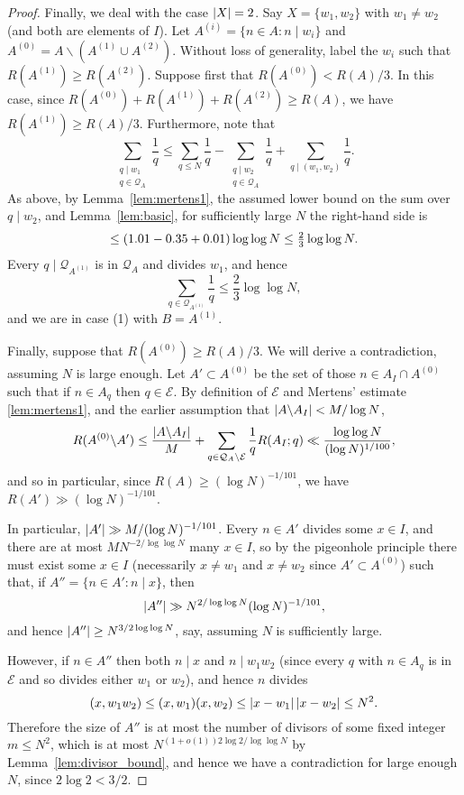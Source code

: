\begin{proof}
Finally, we deal with the case $\left\lvert X\right\rvert=2$. Say $X=\{w_1,w_2\}$ with $w_1\neq w_2$ (and both are elements of $I$). Let $A^{(i)}=\{n\in A: n\mid w_i\}$ and $A^{(0)}=A\backslash (A^{(1)}\cup A^{(2)})$. Without loss of generality, label the $w_i$ such that $R(A^{(1)})\geq R(A^{(2)})$.  Suppose first that $R(A^{(0)})<R(A)/3$. In this case, since $R(A^{(0)})+R(A^{(1)})+R(A^{(2)})\geq R(A)$, we have $R(A^{(1)})\geq R(A)/3$. Furthermore, note that
\[\sum_{\substack{q\mid w_1\\ q\in \mathcal{Q}_A}}\frac{1}{q}\leq \sum_{q\leq N}\frac{1}{q}-\sum_{\substack{q\mid w_2\\ q\in \mathcal{Q}_A}}\frac{1}{q}+\sum_{q\mid (w_1,w_2)}\frac{1}{q}.\]
As above, by Lemma~\ref{lem:mertens1}, the assumed lower bound on the sum over $q\mid w_2$, and Lemma~\ref{lem:basic}, for sufficiently large $N$ the right-hand side is
\[\leq \left( 1.01-0.35+0.01\right)\log\log N\leq \tfrac{2}{3}\log\log N.\]
Every $q\mid \mathcal{Q}_{A^{(1)}}$ is in $\mathcal{Q}_A$ and divides $w_1$, and hence
\[\sum_{q\in \mathcal{Q}_{A^{(1)}}}\frac{1}{q}\leq\frac{2}{3}\log\log N,\]
and we are in case (1) with $B=A^{(1)}$.

Finally, suppose that $R(A^{(0)})\geq R(A)/3$. We will derive a contradiction, assuming $N$ is large enough.  Let $A'\subset A^{(0)}$ be the set of those $n\in A_I\cap A^{(0)}$ such that if $n\in A_q$ then $q\in\mathcal{E}$. By definition of $\mathcal{E}$ and Mertens' estimate \ref{lem:mertens1}, and the earlier assumption that $\left\lvert A\backslash A_I\right\rvert<M/\log N$,
  \[R(A^{(0)}\backslash A')\leq \frac{\left\lvert A\backslash A_I\right\rvert}{M}+\sum_{q\in\mathcal{Q}_A\backslash \mathcal{E}}\frac{1}{q}R(A_I;q)\ll \frac{\log\log N}{(\log N)^{1/100}},\]
  and so  in particular, since $R(A)\geq (\log N)^{-1/101}$, we have $R(A')\gg (\log N)^{-1/101}$.

  In particular, $\left\lvert A'\right\rvert\gg M/(\log N)^{-1/101}$. Every $n\in A'$ divides some $x\in I$, and there are at most $MN^{-2/\log\log N}$ many $x\in I$, so by the pigeonhole principle there must exist some $x\in I$ (necessarily $x\neq w_1$ and $x\neq w_2$ since $A'\subset A^{(0)}$) such that, if $A''=\{ n\in A' : n\mid x\}$, then
  \[\left\lvert A''\right\rvert\gg N^{2/\log\log N}(\log N)^{-1/101},\]
  and hence $\left\lvert A''\right\rvert\geq N^{3/2\log\log N}$, say, assuming $N$ is sufficiently large.

  However, if $n\in A''$ then both $n\mid x$ and $n\mid w_1w_2$ (since every $q$ with $n\in A_q$ is in $\mathcal{E}$ and so divides either $w_1$ or $w_2$), and hence $n$ divides
  \[(x,w_1w_2)\leq (x,w_1)(x,w_2)\leq \left\lvert x-w_1\right\rvert\left\lvert x-w_2\right\rvert\leq N^2.\]
  Therefore the size of $A''$ is at most the number of divisors of some fixed integer $m\leq N^2$, which is at most $N^{(1+o(1))2\log 2/\log\log N}$ by Lemma~\ref{lem:divisor_bound}, and hence we have a contradiction for large enough $N$, since $2\log 2< 3/2$.
\end{proof}

